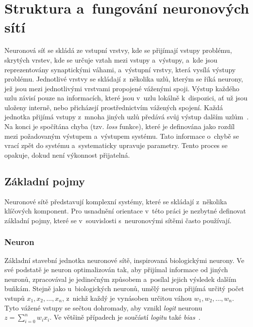 \section{Struktura a~fungování neuronových sítí}
Neuronová síť se skládá ze vstupní vrstvy, kde se přijímají vstupy problému, skrytých vrstev, kde se určuje vztah mezi vstupy a~výstupy, a~kde jsou reprezentovány synaptickými váhami, a~výstupní vrstvy, která vysílá výstupy problému. Jednotlivé vrstvy se skládají z~několika uzlů, kterým se říká neurony, jež jsou mezi jednotlivými vrstvami propojené váženými spoji. Výstup každého uzlu závisí pouze na informacích, které jsou v~uzlu lokálně k~dispozici, ať už jsou uloženy interně, nebo přicházejí prostřednictvím vážených spojení. Každá jednotka přijímá vstupy z~mnoha jiných uzlů předává svůj výstup dalším uzlům~\cite{intro_to_nn}. Na konci je spočítána chyba (tzv. \textit{loss} funkce), které je definována jako rozdíl mezi požadovaným výstupem a~výstupem systému. Tato informace o~chybě se vrací zpět do systému a~systematicky upravuje parametry. Tento proces se opakuje, dokud není výkonnost přijatelná.

\subsection{Základní pojmy}
\label{zakladni_pojmy}
Neuronové sítě představují komplexní systémy, které se skládají z~několika klíčových komponent. Pro usnadnění orientace v~této práci je nezbytné definovat základní pojmy, které se v~souvislosti s~neuronovými sítěmi často používají.

\subsubsection*{Neuron}
Základní stavební jednotka neuronové sítě, inspirovaná biologickými neurony. Ve své podstatě je neuron optimalizován tak, aby přijímal informace od jiných neuronů, zpracovával je jedinečným způsobem a~posílal jejich výsledek dalším buňkám. Stejně jako u~biologických neuronů, umělý neuron přijímá určitý počet vstupů $x_{1}, x_{2},\dots,x_{n}$, z~nichž každý je vynásoben určitou váhou $w_{1}, w_{2},\dots,w_{n}$. Tyto vážené vstupy se sečtou dohromady, aby vznikl \textit{logit} neuronu $z=\sum_{i=0}^n w_{i}x_{i}$. Ve většině případech je součástí \textit{logitu} také \textit{bias}~\cite{dl_fundamentals}.

